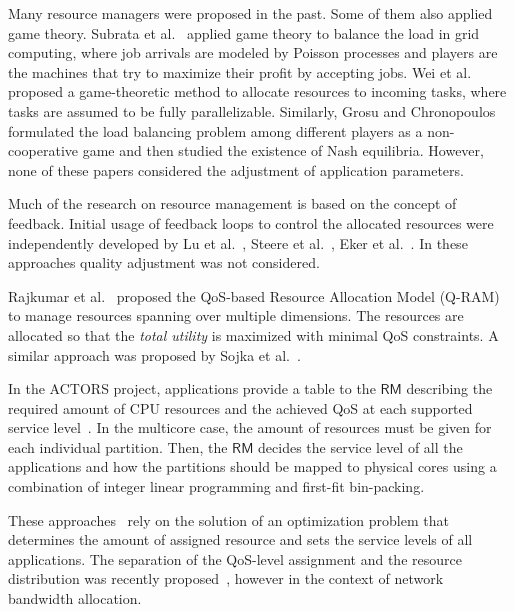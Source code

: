 \documentclass[nobiblatex]{LTHthesis}
\newcommand{\martina}[1]{\todo[inline,color=red!30,caption={}]{\textbf{Martina:} #1}}
\begin{document}
Many resource managers were proposed in the past. Some of them also
applied game theory.  Subrata et al.~\cite{Sub08} applied game theory
to balance the load in grid computing, where job arrivals are modeled by
Poisson processes and players are the machines that try to maximize
their profit by accepting jobs.  Wei et al.~\cite{Wei10} proposed a
game-theoretic method to allocate resources to incoming tasks, where tasks
are assumed to be fully parallelizable.  Similarly, Grosu and
Chronopoulos~\cite{Gro05} formulated the load balancing problem among
different players as a non-cooperative game and then studied the existence of Nash
equilibria.  However, none of these papers considered the adjustment
of application parameters.

Much of the research on resource management is based on the concept of
feedback. Initial usage of feedback loops to control the allocated
resources were independently developed by Lu et al.~\cite{LuS99a},
Steere et al.~\cite{Ste99}, Eker et al.~\cite{Eke00}. In these
approaches quality adjustment was not considered.

Rajkumar et al.~\cite{Raj97a} proposed the QoS-based Resource
Allocation Model (Q-RAM) to manage resources spanning over multiple
dimensions. The resources are allocated so that the \emph{total 
utility} is maximized with minimal QoS constraints.
A similar approach was proposed by Sojka et al.~\cite{Soj11}.
 
In the ACTORS project, applications provide a table to the
$\mathsf{RM}$ describing the required amount of CPU resources and the
achieved QoS at each supported service level~\cite{Bin11,Arz11}.  In the multicore case, the amount of
resources must be given for each individual partition. Then, the
$\mathsf{RM}$ decides the service level of all the applications and
how the partitions should be mapped to physical cores using a
combination of integer linear programming and first-fit bin-packing.

These approaches~\cite{Raj97a,Soj11,Bin11,Arz11} rely on the solution
of an optimization problem that determines the amount of assigned
resource and sets the service levels of all applications. The
separation of the QoS-level assignment and the resource distribution
was recently proposed~\cite{Sil11}, however in the context of network
bandwidth allocation.

\martina{End of rephrase}
\end{document}
